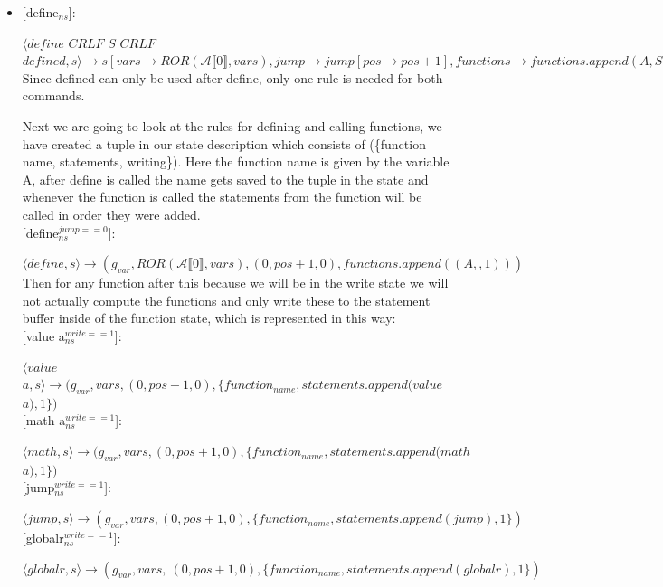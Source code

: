 \documentclass{article}
\begin{document}
\begin{itemize}
\item {[define$_{ns}$]}:

$\langle define$ $CRLF$ $S$ $CRLF$ $defined, s \rangle \rightarrow s[vars \rightarrow ROR(\mathscr{A}\llbracket 0\rrbracket ,vars), jump \rightarrow jump[pos \rightarrow pos+1], functions \rightarrow functions.append(A,S)]$\\

Since defined can only be used after define, only one rule is needed for both commands. 

\iffalse
Next we are going to look at the rules for defining and calling functions, we have created a tuple in our state description which consists of (\{function name, statements, writing\}). Here the function name is given by the variable A, after define is called the name gets saved to the tuple in the state and whenever the function is called the statements from the function will be called in order they were added.\\

{[define$_{ns}^{jump==0}$]}:

$\langle define, s \rangle \rightarrow (g_{var},ROR(\mathscr{A}\llbracket 0\rrbracket ,vars), (0,pos+1,0),functions.append((A,{},1)))$\\

Then for any function after this because we will be in the write state we will not actually compute the functions and only write these to the statement buffer inside of the function state, which is represented in this way:\\

{[value a$_{ns}^{write==1}$]}:

$\langle value$ $a, s \rangle \rightarrow (g_{var},vars, (0,pos+1,0),\{function_{name},statements.append(value$ $a),1\})$\\

{[math a$_{ns}^{write==1}$]}:

$\langle math, s \rangle \rightarrow (g_{var},vars, (0,pos+1,0),\{function_{name},statements.append(math$ $a),1\})$\\

{[jump$_{ns}^{write==1}$]}:

$\langle jump, s \rangle \rightarrow (g_{var},vars, (0,pos+1,0),\{function_{name},statements.append(jump),1\})$\\

{[globalr$_{ns}^{write==1}$]}:

$\langle globalr, s \rangle \rightarrow (g_{var},vars,\ (0,pos+1,0),\{function_{name},statements.append(globalr),1\})$\\


\end{itemize}
\end{document}
